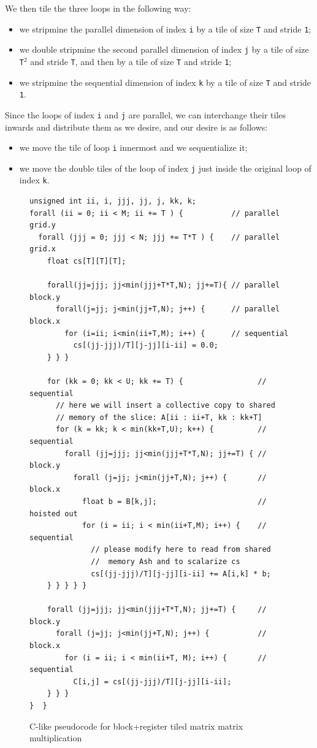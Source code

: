 \documentclass[acmsmall,review]{acmart}\settopmatter{printfolios=true,printccs=false,printacmref=false}
\begin{document}
We then tile the three loops in the following way: 
\begin{itemize}
    \item we stripmine the parallel dimension of index {\tt i} by a tile of
        size {\tt T} and stride {\tt 1};
    \item we double stripmine the second parallel dimension of index {\tt j} by
            a tile of size {\tt T$^2$} and stride {\tt T}, and then by a tile
            of size {\tt T} and stride {\tt 1};
    \item we stripmine the sequential dimension of index {\tt k} by a tile
        of size {\tt T} and stride {\tt 1}. 
\end{itemize}
Since the loops of index {\tt i} and {\tt j} are parallel, we can interchange 
their tiles inwards and distribute them as we desire, and our desire is as follows:
\begin{itemize}
    \item we move the tile of loop {\tt i} innermost and we sequentialize it;
    \item we move the double tiles of the loop of index {\tt j} just inside the 
            original loop of index {\tt k}.
\end{itemize}

\begin{figure}
\begin{lstlisting}[mathescape=true]
unsigned int ii, i, jjj, jj, j, kk, k;
forall (ii = 0; ii < M; ii += T ) {           // parallel grid.y
  forall (jjj = 0; jjj < N; jjj += T*T ) {    // parallel grid.x
    float cs[T][T][T];

    forall(jj=jjj; jj<min(jjj+T*T,N); jj+=T){ // parallel block.y
      forall(j=jj; j<min(jj+T,N); j++) {      // parallel block.x
        for (i=ii; i<min(ii+T,M); i++) {      // sequential
          cs[(jj-jjj)/T][j-jj][i-ii] = 0.0;
    } } }

    for (kk = 0; kk < U; kk += T) {                 // sequential
      // here we will insert a collective copy to shared
      // memory of the slice: A[ii : ii+T, kk : kk+T]
      for (k = kk; k < min(kk+T,U); k++) {          // sequential
        forall (jj=jjj; jj<min(jjj+T*T,N); jj+=T) { // block.y
          forall (j=jj; j<min(jj+T,N); j++) {       // block.x
            float b = B[k,j];                       // hoisted out
            for (i = ii; i < min(ii+T,M); i++) {    // sequential
              // please modify here to read from shared
              //  memory Ash and to scalarize cs
              cs[(jj-jjj)/T][j-jj][i-ii] += A[i,k] * b;
    } } } } }

    forall (jj=jjj; jj<min(jjj+T*T,N); jj+=T) {     // block.y
      forall (j=jj; j<min(jj+T,N); j++) {           // block.x
        for (i = ii; i < min(ii+T, M); i++) {       // sequential
          C[i,j] = cs[(jj-jjj)/T][j-jj][i-ii];
    } } }
}  }
\end{lstlisting}\vspace{-4ex}
\caption{C-like pseudocode for block+register tiled matrix matrix multiplication}
\label{fig-mat-mat-mul-block-reg-c}
\end{figure}
\end{document}
